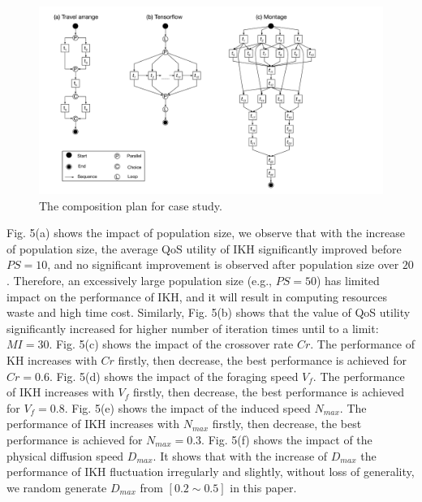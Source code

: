 \documentclass[10pt,journal,compsoc]{IEEEtran}
\begin{document}
\begin{figure}[!t]
\centering
\includegraphics[width=5in]{./img/DAG.pdf}
\caption{The composition plan for case study.}
\label{fig_DAG}
\end{figure}

Fig. 5(a) shows the impact of population size, we observe that with the increase of population size, the average QoS utility of IKH significantly improved before $PS=10$, and no significant improvement is observed after population size over $20$. Therefore, an excessively large population size (e.g., $PS=50$) has limited impact on the performance of IKH, and it will result in computing resources waste and high time cost.
Similarly, Fig. 5(b) shows that the value of QoS utility significantly increased for higher number of iteration times until to a limit: $MI = 30$. 
Fig. 5(c) shows the impact of the crossover rate $Cr$. The performance of KH increases with $Cr$ firstly, then decrease, the best performance is achieved for $Cr = 0.6$.
Fig. 5(d) shows the impact of the foraging speed $V_f$. The performance of IKH increases with $V_f$ firstly, then decrease, the best performance is achieved for $V_f = 0.8$.
Fig. 5(e) shows the impact of the induced speed $N_{max}$. The performance of IKH increases with $N_{max}$ firstly, then decrease, the best performance is achieved for $N_{max} = 0.3$.
Fig. 5(f) shows the impact of the physical diffusion speed $D_{max}$. It shows that with the increase of $D_{max}$ the performance of IKH fluctuation irregularly and slightly, without loss of generality, we random generate $D_{max}$ from $[0.2 \sim 0.5]$ in this paper.
\end{document}
